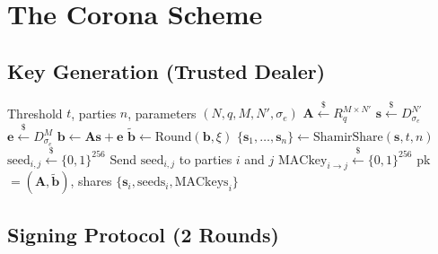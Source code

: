 \section{The Corona Scheme}

\label{sec:scheme}

\subsection{Key Generation (Trusted Dealer)}

\begin{algorithm}[H]
\caption{Corona Key Generation}
\label{alg:keygen}
\begin{algorithmic}[1]
\Require Threshold $t$, parties $n$, parameters $(N, q, M, N', \sigma_e)$
\State $\mathbf{A} \stackrel{\$}{\leftarrow} R_q^{M \times N'}$ 
\State $\mathbf{s} \stackrel{\$}{\leftarrow} D_{\sigma_e}^{N'}$ 
\State $\mathbf{e} \stackrel{\$}{\leftarrow} D_{\sigma_e}^{M}$ 
\State $\mathbf{b} \gets \mathbf{A}\mathbf{s} + \mathbf{e}$ 
\State $\tilde{\mathbf{b}} \gets \text{Round}(\mathbf{b}, \xi)$ 
\State $\{\mathbf{s}_1, \ldots, \mathbf{s}_n\} \gets \text{ShamirShare}(\mathbf{s}, t, n)$ 
\State {}
    \State $\text{seed}_{i,j} \stackrel{\$}{\leftarrow} \{0,1\}^{256}$ 
    \State Send $\text{seed}_{i,j}$ to parties $i$ and $j$
\EndFor
\State {}
    \State $\text{MACkey}_{i \to j} \stackrel{\$}{\leftarrow} \{0,1\}^{256}$
\EndFor
\State \Return pk $= (\mathbf{A}, \tilde{\mathbf{b}})$, shares $\{\mathbf{s}_i, \text{seeds}_i, \text{MACkeys}_i\}$
\end{algorithmic}
\end{algorithm}

\subsection{Signing Protocol (2 Rounds)}


